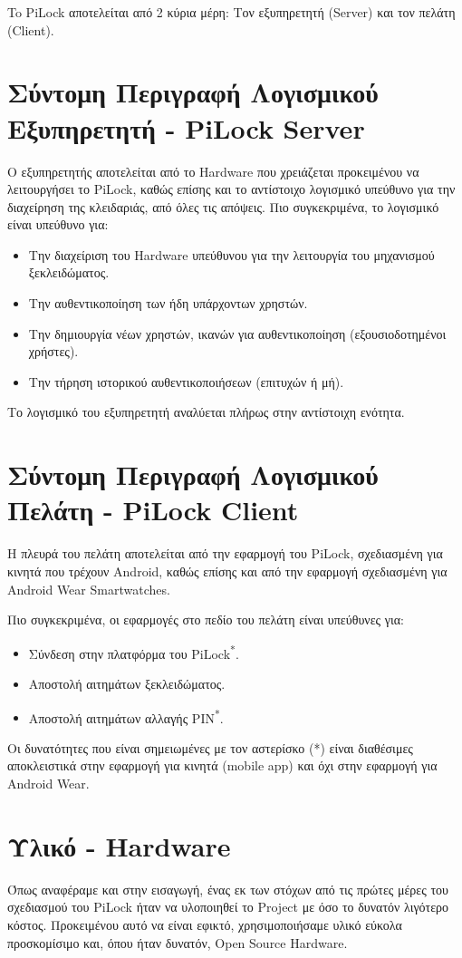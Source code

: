 To PiLock αποτελείται από 2 κύρια μέρη: Τον εξυπηρετητή (Server) και τον πελάτη (Client).

\section{Σύντομη Περιγραφή Λογισμικού Εξυπηρετητή - PiLock Server}
	Ο εξυπηρετητής αποτελείται από το Hardware που χρειάζεται προκειμένου να λειτουργήσει το PiLock, καθώς επίσης και το αντίστοιχο λογισμικό υπεύθυνο για την διαχείρηση της κλειδαριάς, από όλες τις απόψεις. Πιο συγκεκριμένα, το λογισμικό είναι υπεύθυνο για:
	\begin{itemize}
		\item Την διαχείριση του Hardware υπεύθυνου για την λειτουργία του μηχανισμού ξεκλειδώματος.
		\item Την αυθεντικοποίηση των ήδη υπάρχοντων χρηστών.
		\item Την δημιουργία νέων χρηστών, ικανών για αυθεντικοποίηση (εξουσιοδοτημένοι χρήστες).
		\item Την τήρηση ιστορικού αυθεντικοποιήσεων (επιτυχών ή μή).
	\end{itemize}
	Το λογισμικό του εξυπηρετητή αναλύεται πλήρως στην αντίστοιχη ενότητα. %

\section{Σύντομη Περιγραφή Λογισμικού Πελάτη - PiLock Client}
	Η πλευρά του πελάτη αποτελείται από την εφαρμογή του PiLock, σχεδιασμένη για κινητά που τρέχουν Android, καθώς επίσης και από την εφαρμογή σχεδιασμένη για Android Wear Smartwatches.

	Πιο συγκεκριμένα, οι εφαρμογές στο πεδίο του πελάτη είναι υπεύθυνες για:

	\begin{itemize}
		\item Σύνδεση στην πλατφόρμα του PiLock\textsuperscript{*}.
		\item Αποστολή αιτημάτων ξεκλειδώματος.
		\item Αποστολή αιτημάτων αλλαγής PIN\textsuperscript{*}.
	\end{itemize}
	{\footnotesize Οι δυνατότητες που είναι σημειωμένες με τον αστερίσκο (*) είναι διαθέσιμες αποκλειστικά στην εφαρμογή για κινητά (mobile app) και όχι στην εφαρμογή για Android Wear.}

\section{Υλικό - Hardware}
	\label{sec:hardw}
	Όπως αναφέραμε και στην εισαγωγή, ένας εκ των στόχων από τις πρώτες μέρες του σχεδιασμού του PiLock ήταν να υλοποιηθεί το Project με όσο το δυνατόν λιγότερο κόστος. Προκειμένου αυτό να είναι εφικτό, χρησιμοποιήσαμε υλικό εύκολα προσκομίσιμο και, όπου ήταν δυνατόν, Open Source Hardware.

